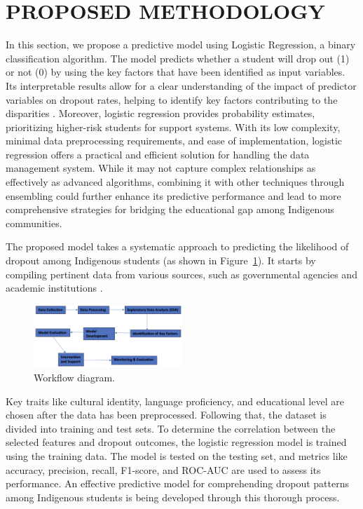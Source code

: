 \documentclass[a4paper,twoside]{article}
\begin{document}
\section{\uppercase{Proposed Methodology}}
\label{sec:Proposed Methodology}
In this section, we propose a predictive model using Logistic Regression, a
binary classification algorithm. The model predicts whether a student will
drop out (1) or not (0) by using the key factors that have been identified
as input variables. Its interpretable results allow for a clear understanding of the impact of predictor variables on dropout rates, helping to identify key factors contributing to the disparities \cite{Das21}. Moreover, logistic regression provides probability estimates, prioritizing higher-risk students for support systems. With its low complexity, minimal data preprocessing requirements, and ease of implementation, logistic regression offers a practical and efficient solution for handling the data management system. While it may not capture complex relationships as effectively as advanced algorithms, combining it with other techniques through ensembling could further enhance its predictive performance and lead to more comprehensive strategies for bridging the educational gap among Indigenous communities.

The proposed model takes a systematic approach to predicting the likelihood of dropout among Indigenous students (as shown in Figure~\ref{fig:flowdiagram}). It starts by compiling pertinent
data from various sources, such as governmental agencies and academic
institutions \cite{Bisong19}. 
\begin{figure}[H]
    \centering 
    \includegraphics[width=0.5\textwidth, angle=0]{images/FlowDiagram.png}	
    \captionsetup{format=plain, justification=centering}
    \caption{Workflow diagram.}
    \label{fig:flowdiagram}
\end{figure}

Key traits like cultural identity, language proficiency, and educational level are chosen after the data has been preprocessed. Following that, the dataset is divided into training and test sets. To determine the correlation between the selected features and dropout outcomes, the logistic regression model is trained using the training data. The model is tested on the testing set, and metrics like accuracy, precision, recall, F1-score, and ROC-AUC \cite{GMK20} are used to assess its performance. An effective predictive model for comprehending dropout patterns among Indigenous students is being developed through this thorough process.
\end{document}
